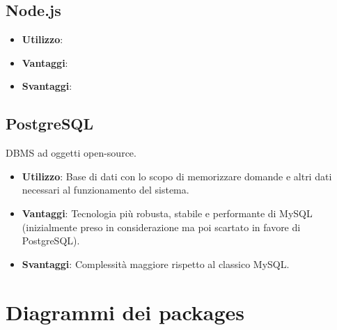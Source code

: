 \documentclass[a4paper,11pt]{article}
\begin{document}
	\subsection{Node.js}
	\begin{itemize}
		\item\textbf{Utilizzo}:
		\item\textbf{Vantaggi}:
		\item\textbf{Svantaggi}:
	\end{itemize}
	\subsection{PostgreSQL}
	DBMS ad oggetti open-source.
	\begin{itemize}
		\item\textbf{Utilizzo}: Base di dati con lo scopo di memorizzare domande e altri dati necessari al funzionamento del sistema.
		\item\textbf{Vantaggi}: Tecnologia più robusta, stabile e performante di MySQL (inizialmente preso in considerazione ma poi scartato in favore di PostgreSQL).
		\item\textbf{Svantaggi}: Complessità maggiore rispetto al classico MySQL.
	\end{itemize}
	\newpage
	\section{Diagrammi dei packages}
\end{document}
